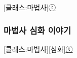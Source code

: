 \documentclass{report}
\begin{document}
	\begin{story}{}{[클래스:마법사]\hyperlink{celesteela}{ⓣ}}
		
	\end{story}
	
	\subsubsection{마법사 심화 이야기}
		\begin{story}{}{[클래스:마법사][심화]\hyperlink{celesteela}{ⓣ}}
			
		\end{story}
\end{document}
